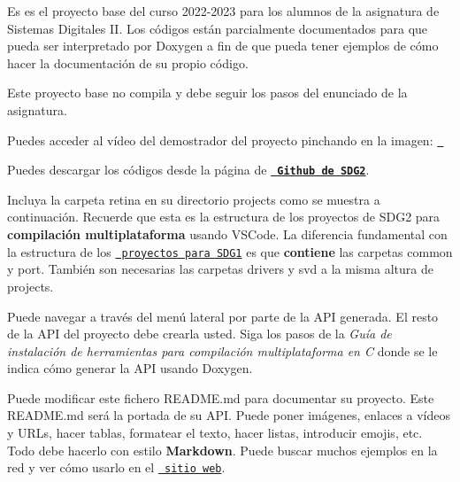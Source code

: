 Es es el proyecto base del curso 2022-\/2023 para los alumnos de la asignatura de Sistemas Digitales II. Los códigos están parcialmente documentados para que pueda ser interpretado por Doxygen a fin de que pueda tener ejemplos de cómo hacer la documentación de su propio código.

Este proyecto base no compila y debe seguir los pasos del enunciado de la asignatura.

Puedes acceder al vídeo del demostrador del proyecto pinchando en la imagen\+: \href{https://youtu.be/7yMZnfwStgs}{\texttt{ }}

Puedes descargar los códigos desde la página de {\bfseries{\href{https://github.com/sdg2DieUpm/retina}{\texttt{ Github de SDG2}}}}.

Incluya la carpeta {\ttfamily retina} en su directorio {\ttfamily projects} como se muestra a continuación. Recuerde que esta es la estructura de los proyectos de SDG2 para {\bfseries{compilación multiplataforma}} usando VSCode. La diferencia fundamental con la estructura de los \href{https://sdg1dieupm.github.io/c_basics/}{\texttt{ proyectos para SDG1}} es que {\bfseries{contiene}} las carpetas {\ttfamily common} y {\ttfamily port}. También son necesarias las carpetas {\ttfamily drivers} y {\ttfamily svd} a la misma altura de {\ttfamily projects}.


\begin{DoxyCode}{0}

\end{DoxyCode}
 Puede navegar a través del menú lateral por parte de la API generada. El resto de la API del proyecto debe crearla usted. Siga los pasos de la {\itshape Guía de instalación de herramientas para compilación multiplataforma en C} donde se le indica cómo generar la API usando Doxygen.

Puede modificar este fichero README.\+md para documentar su proyecto. Este README.\+md será la portada de su API. Puede poner imágenes, enlaces a vídeos y URLs, hacer tablas, formatear el texto, hacer listas, introducir emojis, etc. Todo debe hacerlo con estilo {\bfseries{Markdown}}. Puede buscar muchos ejemplos en la red y ver cómo usarlo en el \href{https://www.markdownguide.org/basic-syntax/}{\texttt{ sitio web}}. 